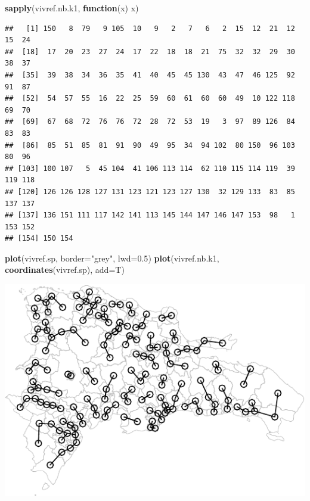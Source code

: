 \documentclass[11pt,]{article}
\newenvironment{Shaded}{\begin{snugshade}}{\end{snugshade}}
\newcommand{\KeywordTok}[1]{\textcolor[rgb]{0.13,0.29,0.53}{\textbf{#1}}}
\newcommand{\DataTypeTok}[1]{\textcolor[rgb]{0.13,0.29,0.53}{#1}}
\newcommand{\FloatTok}[1]{\textcolor[rgb]{0.00,0.00,0.81}{#1}}
\newcommand{\StringTok}[1]{\textcolor[rgb]{0.31,0.60,0.02}{#1}}
\newcommand{\ControlFlowTok}[1]{\textcolor[rgb]{0.13,0.29,0.53}{\textbf{#1}}}
\newcommand{\NormalTok}[1]{#1}
\begin{document}
\begin{Shaded}
\begin{Highlighting}[]
\KeywordTok{sapply}\NormalTok{(vivref.nb.k1, }\ControlFlowTok{function}\NormalTok{(x) x)}
\end{Highlighting}
\end{Shaded}

\begin{verbatim}
##   [1] 150   8  79   9 105  10   9   2   7   6   2  15  12  21  12  15  24
##  [18]  17  20  23  27  24  17  22  18  18  21  75  32  32  29  30  38  37
##  [35]  39  38  34  36  35  41  40  45  45 130  43  47  46 125  92  91  87
##  [52]  54  57  55  16  22  25  59  60  61  60  60  49  10 122 118  69  70
##  [69]  67  68  72  76  76  72  28  72  53  19   3  97  89 126  84  83  83
##  [86]  85  51  85  81  91  90  49  95  34  94 102  80 150  96 103  80  96
## [103] 100 107   5  45 104  41 106 113 114  62 110 115 114 119  39 119 118
## [120] 126 126 128 127 131 123 121 123 127 130  32 129 133  83  85 137 137
## [137] 136 151 111 117 142 141 113 145 144 147 146 147 153  98   1 153 152
## [154] 150 154
\end{verbatim}

\begin{Shaded}
\begin{Highlighting}[]
\KeywordTok{plot}\NormalTok{(vivref.sp, }\DataTypeTok{border=}\StringTok{"grey"}\NormalTok{, }\DataTypeTok{lwd=}\FloatTok{0.5}\NormalTok{)}
\KeywordTok{plot}\NormalTok{(vivref.nb.k1, }\KeywordTok{coordinates}\NormalTok{(vivref.sp), }\DataTypeTok{add=}\NormalTok{T)}
\end{Highlighting}
\end{Shaded}

\includegraphics{proyecto_files/figure-latex/unnamed-chunk-2-3.pdf}
\end{document}

